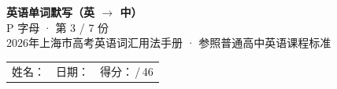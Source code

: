 \documentclass[10pt,a4paper]{article}
\begin{document}
\pagestyle{plain}

\begin{center}
{\LARGE\bfseries 英语单词默写（英 $\to$ 中）}\\[0.22em]
{\large P 字母 · 第 3 / 7 份}\\[0.18em]
{\small 2026年上海市高考英语词汇用法手册 · 参照普通高中英语课程标准}
\end{center}

\vspace{0.25em}
\noindent\begin{tabular}{@{}p{}@{}p{}@{}p{}@{}}
姓名：\underline{\hspace{2.0cm}} & 日期：\underline{\hspace{2.0cm}} & 得分：\underline{\hspace{1.3cm}}\,/\,46 \\
\end{tabular}

\vspace{0.3em}

\vspace{0.08em}
\end{document}
